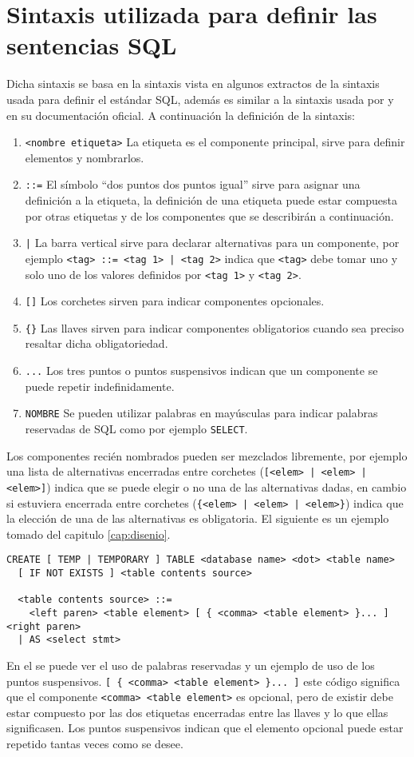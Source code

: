 \section{Sintaxis utilizada para definir las sentencias SQL}
Dicha sintaxis se basa en la sintaxis vista en algunos extractos de la sintaxis usada para definir el estándar SQL, además es similar a la sintaxis usada por \p y \m en su documentación oficial. A continuación la definición de la sintaxis:
\begin{enumerate}
\item \verb=<nombre etiqueta>= La etiqueta es el componente principal, sirve para definir elementos y nombrarlos.
%
\item \verb|::=| El símbolo ``dos puntos dos puntos igual'' sirve para asignar una definición a la etiqueta, la definición de una etiqueta puede estar compuesta por otras etiquetas y de los componentes que se describirán a continuación.
%
\item \verb=|= La barra vertical sirve para declarar alternativas para un componente, por ejemplo \verb(<tag> ::= <tag 1> | <tag 2>( indica que \verb=<tag>= debe tomar uno y solo uno de los valores definidos por \verb=<tag 1>= y \verb=<tag 2>=.
%
\item \verb=[]= Los corchetes sirven para indicar componentes opcionales.
%
\item \verb={}= Las llaves sirven para indicar componentes obligatorios cuando sea preciso resaltar dicha obligatoriedad.
%
\item \verb=...= Los tres puntos o puntos suspensivos indican que un componente se puede repetir indefinidamente.
%
\item \verb=NOMBRE= Se pueden utilizar palabras en mayúsculas para indicar palabras reservadas de SQL como por ejemplo \verb=SELECT=.
\end{enumerate}
%
Los componentes recién nombrados pueden ser mezclados libremente, por ejemplo una lista de alternativas encerradas entre corchetes (\verb=[<elem> | <elem> | <elem>]=) indica que se puede elegir o no una de las alternativas dadas, en cambio si estuviera encerrada entre corchetes (\verb={<elem> | <elem> | <elem>}=) indica que la elección de una de las alternativas es obligatoria. El siguiente es un ejemplo tomado del capitulo \ref{cap:disenio}.
%
\begin{Verbatim}[frame=leftline, framesep=3mm]
  CREATE [ TEMP | TEMPORARY ] TABLE <database name> <dot> <table name> 
  [ IF NOT EXISTS ] <table contents source>

  <table contents source> ::=
    <left paren> <table element> [ { <comma> <table element> }... ] <right paren>
  | AS <select stmt>
\end{Verbatim}
%
En el se puede ver el uso de palabras reservadas y un ejemplo de uso de los puntos suspensivos. \verb=[ { <comma> <table element> }... ]= este código significa que el componente \verb=<comma> <table element>= es opcional, pero de existir debe estar compuesto por las dos etiquetas encerradas entre las llaves y lo que ellas significasen. Los puntos suspensivos indican que el elemento opcional puede estar repetido tantas veces como se desee. 